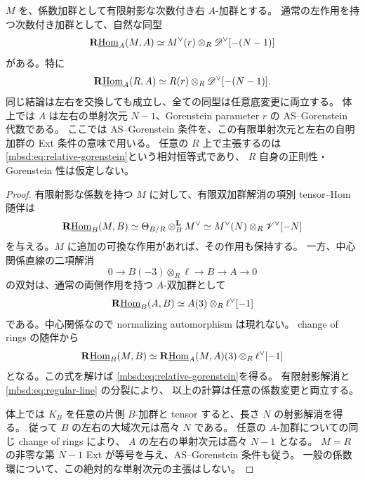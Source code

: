\begin{theorem}
\label{mbsd:thm:gorenstein}
$M$ を、係数加群として有限射影な次数付き右 $A$-加群とする。
通常の左作用を持つ次数付き加群として、自然な同型
\begin{equation}\label{mbsd:eq:relative-gorenstein}
 \mathbf R\underline{\operatorname{Hom}}_A(M,A)
 \simeq M^\vee(r)\otimes_R\mathscr D^\vee[-(N-1)]
\end{equation}
がある。特に
\[
 \mathbf R\underline{\operatorname{Hom}}_A(R,A)
 \simeq R(r)\otimes_R\mathscr D^\vee[-(N-1)].
\]
同じ結論は左右を交換しても成立し、全ての同型は任意底変更に両立する。
体上では $A$ は左右の単射次元 $N-1$、Gorenstein parameter $r$ の
AS--Gorenstein 代数である。
ここでは AS--Gorenstein 条件を、この有限単射次元と左右の自明加群の Ext 条件の意味で用いる。
任意の $R$ 上で主張するのは \eqref{mbsd:eq:relative-gorenstein}という相対恒等式であり、
$R$ 自身の正則性・Gorenstein 性は仮定しない。
\end{theorem}
\begin{proof}
有限射影な係数を持つ $M$ に対して、有限双加群解消の項別 tensor--Hom 随伴は
\[
 \mathbf R\underline{\operatorname{Hom}}_B(M,B)
 \simeq\Theta_{B/R}\otimes_B^{\mathbf L}M^\vee
 \simeq M^\vee(N)\otimes_R\mathscr V^\vee[-N]
\]
を与える。$M$ に追加の可換な作用があれば、その作用も保持する。
一方、中心関係直線の二項解消
\[
 0\longrightarrow B(-3)\otimes_R\ell\longrightarrow B\longrightarrow A\longrightarrow0
\]
の双対は、通常の両側作用を持つ $A$-双加群として
\[
 \mathbf R\underline{\operatorname{Hom}}_B(A,B)
 \simeq A(3)\otimes_R\ell^\vee[-1]
\]
である。中心関係なので normalizing automorphism は現れない。
change of rings の随伴から
\[
 \mathbf R\underline{\operatorname{Hom}}_B(M,B)
 \simeq\mathbf R\underline{\operatorname{Hom}}_A(M,A)(3)\otimes_R\ell^\vee[-1]
\]
となる。この式を解けば \eqref{mbsd:eq:relative-gorenstein}を得る。
有限射影解消と \eqref{mbsd:eq:regular-line} の分裂により、
以上の計算は任意の係数変更と両立する。

体上では $K_B$ を任意の片側 $B$-加群と tensor すると、長さ $N$ の射影解消を得る。
従って $B$ の左右の大域次元は高々 $N$ である。
任意の $A$-加群についての同じ change of rings により、
$A$ の左右の単射次元は高々 $N-1$ となる。
$M=R$ の非零な第 $N-1$ Ext が等号を与え、AS--Gorenstein 条件も従う。
一般の係数環について、この絶対的な単射次元の主張はしない。
\end{proof}

